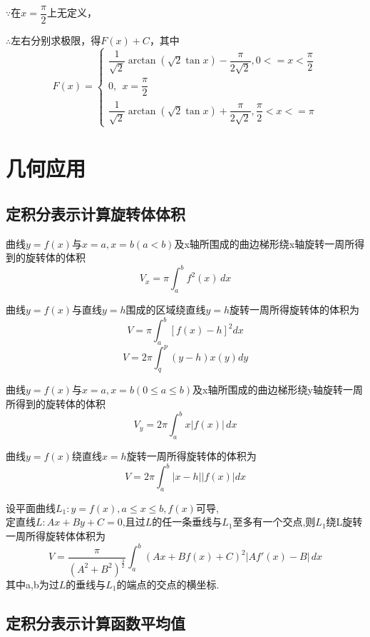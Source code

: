 \(\because\)在\(x = \dfrac{\pi}{2}\)上无定义，

\(\therefore\)左右分别求极限，得\(F(x) + C\)，其中
\[F(x) = \begin{cases}
    \dfrac{1}{\sqrt{2}}\arctan(\sqrt{2}\tan x) - \dfrac{\pi}{2\sqrt{2}}, 0 <= x < \dfrac{\pi}{2} \\ 
    0,\ \ x = \dfrac{\pi}{2} \\ 
    \dfrac{1}{\sqrt{2}}\arctan(\sqrt{2}\tan x) + \dfrac{\pi}{2\sqrt{2}}, \dfrac{\pi}{2} < x <= \pi
\end{cases}\]


\section{几何应用}

\subsection{定积分表示计算旋转体体积}

曲线\(y=f(x)\)与\(x=a,x=b(a < b)\)及x轴所围成的曲边梯形绕x轴旋转一周所得到的旋转体的体积
\begin{displaymath}
V_{x} = \pi \int_{a}^{b} f^{2}(x) \,dx
\end{displaymath}

曲线\(y = f(x)\)与直线\(y = h\)围成的区域绕直线\(y = h\)旋转一周所得旋转体的体积为\[V = \pi\int_a^b[f(x) - h]^2dx\]
\[V = 2\pi\int_q^p(y - h)x(y)dy\]

曲线\(y=f(x)\)与\(x=a,x=b(0 \leq a \leq b)\)及x轴所围成的曲边梯形绕y轴旋转一周所得到的旋转体的体积
\begin{displaymath}
V_{y} = 2\pi \int_{a}^{b} x \lvert f(x) \rvert \,dx
\end{displaymath}

曲线\(y = f(x)\)绕直线\(x = h\)旋转一周所得旋转体的体积为\[V = 2\pi\int_a^b|x - h||f(x)|dx\]

设平面曲线\(L_1 : y = f(x), a \leq x \leq b, f(x)\)可导, \\
定直线\(L : Ax + By + C = 0\),且过\(L\)的任一条垂线与\(L_1\)至多有一个交点,则\(L_1\)绕L旋转一周所得旋转体体积为
\begin{displaymath}
V = \frac{\pi}{(A^2 + B^2)^{\frac{3}{2}}}
\int_{a}^{b} (Ax + Bf(x) + C)^2 \lvert Af'(x) - B \rvert \,dx
\end{displaymath}
其中a,b为过\(L\)的垂线与\(L_1\)的端点的交点的横坐标.


\subsection{定积分表示计算函数平均值}

